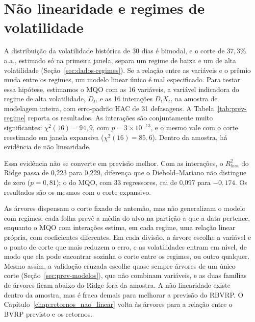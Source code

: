 \section{Não linearidade e regimes de volatilidade}
\label{sec:prev-nao-linearidade}

A distribuição da volatilidade histórica de 30 dias é bimodal, e o corte de
$37{,}3\%$ a.a., estimado só na primeira janela, separa um regime de baixa e
um de alta volatilidade (Seção~\ref{sec:dados-regimes}). Se a relação entre as
variáveis e o prêmio muda entre os regimes, um modelo linear único é mal
especificado. Para testar essa hipótese, estimamos o MQO com as 16
variáveis, a variável indicadora do regime de alta volatilidade, $D_t$, e as 16
interações $D_t X_t$, na amostra de modelagem inteira, com erro-padrão HAC de
31 defasagens. A Tabela~\ref{tab:prev-regime} reporta os resultados. As
interações são conjuntamente muito significantes: $\chi^2(16) = 94{,}9$, com
$p = 3 \times 10^{-13}$, e o mesmo vale com o corte reestimado em janela
expansiva ($\chi^2(16) = 85{,}6$). Dentro da amostra, há evidência de não
linearidade.



Essa evidência não se converte em previsão melhor. Com as interações, o
$R^2_{\text{fora}}$ do Ridge passa de 0,223 para 0,229, diferença que o
Diebold--Mariano não distingue de zero ($p = 0{,}81$); o do MQO, com 33
regressores, cai de 0,097 para $-0{,}174$. Os resultados são os mesmos com o
corte expansivo.

As árvores dispensam o corte fixado de antemão, mas não generalizam o modelo
com regimes: cada folha prevê a média do alvo na partição a que a data
pertence, enquanto o MQO com interações estima, em cada regime, uma relação
linear própria, com coeficientes diferentes. Em cada divisão, a árvore escolhe
a variável e o ponto de corte que mais reduzem o erro, e as volatilidades
entram em nível, de modo que ela pode encontrar sozinha o corte entre os
regimes, ou outro qualquer. Mesmo assim, a
validação cruzada escolhe quase sempre árvores de um único corte
(Seção~\ref{sec:prev-modelos}), que não combinam variáveis, e as duas
famílias de árvores ficam abaixo do Ridge fora da amostra. A não linearidade
existe dentro da amostra, mas é fraca demais para melhorar a previsão do RBVRP.
O Capítulo~\ref{chap:retornos_nao_linear} volta às árvores para a relação entre
o BVRP previsto e os retornos.

